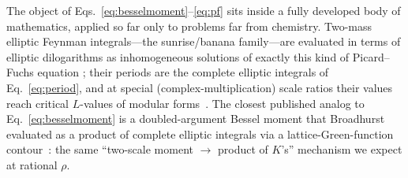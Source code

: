 \documentclass[aps,pra,twocolumn,superscriptaddress,longbibliography]{revtex4-2}
\begin{document}
The object of Eqs.~\eqref{eq:besselmoment}--\eqref{eq:pf} sits inside a
fully developed body of mathematics, applied so far only to problems far from
chemistry.  Two-mass elliptic Feynman integrals---the sunrise/banana
family---are evaluated in terms of elliptic dilogarithms as inhomogeneous
solutions of exactly this kind of Picard--Fuchs equation
\cite{blochvanhove2015,adamsbognerweinzierl2014,blochkerrvanhove2015}; their
periods are the complete elliptic integrals of Eq.~\eqref{eq:period}, and at
special (complex-multiplication) scale ratios their values reach critical
$L$-values of modular
forms~\cite{broadhurst2016,fresansabbahyu2023,zhou_wick2018,zhou_wronskian2018}.  The
closest published analog to Eq.~\eqref{eq:besselmoment} is a doubled-argument
Bessel moment that Broadhurst evaluated as a product of complete elliptic
integrals via a lattice-Green-function contour~\cite{broadhurst2008}: the
same ``two-scale moment $\to$ product of $K$'s'' mechanism we expect at
rational $\rho$.
\end{document}
